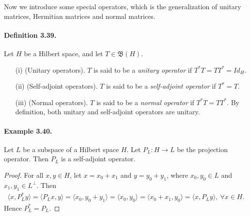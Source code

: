 \documentclass{article}
\begin{document}
Now we introduce some special operators, which is the generalization of unitary matrices, Hermitian matrices and normal matrices.

\paragraph{Definition 3.39.\label{def:3.39}} Let $H$ be a Hilbert space, and let $T\in\mathfrak{B}(H)$.
\begin{itemize}
	\item[(i)] (Unitary operators). $T$ is said to be a \textit{unitary operator} if $T^*T=TT^*=Id_H$.
	\item[(ii)] (Self-adjoint operators). $T$ is said to be a \textit{self-adjoint operator} if $T^*=T$.
	\item[(iii)] (Normal operators). $T$ is said to be a \textit{normal operator} if $T^*T=TT^*$. By definition, both unitary and self-adjoint operators are unitary.
\end{itemize}

\paragraph{Example 3.40.\label{example:3.40}} Let $L$ be a subspace of a Hilbert space $H$. Let $P_L:H\to L$ be the projection operator. Then $P_L$ is a self-adjoint operator.
\begin{proof} For all $x,y\in H$, let $x=x_0+x_1$ and $y=y_0+y_1$, where $x_0,y_0\in L$ and $x_1,y_1\in L^\perp$. Then
\begin{align*}
	\langle x,P_L^*y\rangle = \langle P_L x,y\rangle = \langle x_0,y_0+y_1\rangle = \langle x_0,y_0\rangle = \langle x_0+x_1,y_0 \rangle = \langle x,P_L y\rangle,\ \forall x\in H.
\end{align*}
Hence $P_L^*=P_L$.
\end{proof}
\end{document}
